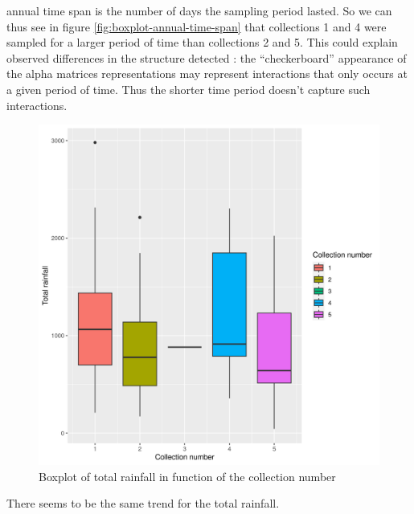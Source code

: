 annual time span is the number of days the sampling period lasted.
So we can thus see in figure \ref{fig:boxplot-annual-time-span} that
collections 1 and 4 were sampled for a larger period of time than
collections 2 and 5. This could explain observed differences in the
structure detected : the ``checkerboard'' appearance of the alpha
matrices representations may represent interactions that only occurs at
a given period of time. Thus the shorter time period doesn't capture
such interactions.

\begin{figure}
\centering
\includegraphics{./img/5bbc4b4b07c0e990a3ae2755165958ffbf517902.png}
\caption{\label{fig:boxplot-total-rainfall}Boxplot of total rainfall in
function of the collection number}
\end{figure}

There seems to be the same trend for the total rainfall.

